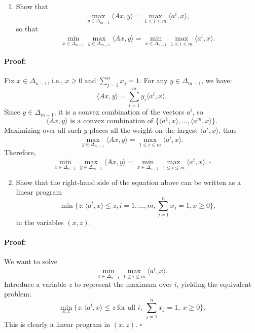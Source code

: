 \documentclass[10pt]{article}
\begin{document}
\begin{enumerate}[label=(\alph*)]
  \item Show that 
  $$\max_{y \in \Delta_{m-1}} \langle Ax, y \rangle = \max_{1\leq i \leq m} \langle a^i, x \rangle,$$
  so that 
  $$\min_{x \in \Delta_{n-1}} \max_{y \in \Delta_{m-1}} \langle Ax, y \rangle = \min_{x \in \Delta_{n-1}} \max_{1\leq i \leq m} \langle a^i, x \rangle.$$
\end{enumerate}

\paragraph{Proof:}


Fix $x \in \Delta_{n-1}$, i.e., $x \geq 0$ and $\sum_{j=1}^n x_j = 1$. For any $y \in \Delta_{m-1}$, we have:
\[
\langle A x, y \rangle = \sum_{i=1}^m y_i \langle a^i, x \rangle.
\]
Since $y \in \Delta_{m-1}$, it is a convex combination of the vectors $a^i$, so 
\[
\langle A x, y \rangle \text{ is a convex combination of } \{\langle a^1, x \rangle, \ldots, \langle a^m, x \rangle\}.
\]
Maximizing over all such $y$ places all the weight on the largest $\langle a^i, x \rangle$, thus
\[
\max_{y \in \Delta_{m-1}} \langle A x, y \rangle = \max_{1 \leq i \leq m} \langle a^i, x \rangle.
\]
Therefore,
\[
\min_{x \in \Delta_{n-1}} \max_{y \in \Delta_{m-1}} \langle A x, y \rangle = \min_{x \in \Delta_{n-1}} \max_{1 \leq i \leq m} \langle a^i, x \rangle. \ \square
\] 



\begin{enumerate}[label=(\alph*)]
  \setcounter{enumi}{1}
  \item Show that the right-hand side of the equation above can be written as a linear program 
  $$ \min\{ z: \langle a^i, x \rangle \leq z, i = 1, \ldots, m, \sum_{j=1}^{n} x_j = 1, x \geq 0\},$$
  in the variables $(x, z)$.
\end{enumerate}

\paragraph{Proof:}

We want to solve 
\[
\min_{x \in \Delta_{n-1}} \max_{1 \leq i \leq m} \langle a^i, x \rangle.
\]
Introduce a variable $z$ to represent the maximum over $i$, yielding the equivalent problem:
\[
\min_{x,z} \{ z : \langle a^i, x \rangle \le z \ \text{for all } i, \ \sum_{j=1}^n x_j = 1, \ x \geq 0\}.
\]
This is clearly a linear program in $(x,z)$. $\square$
\end{document}
